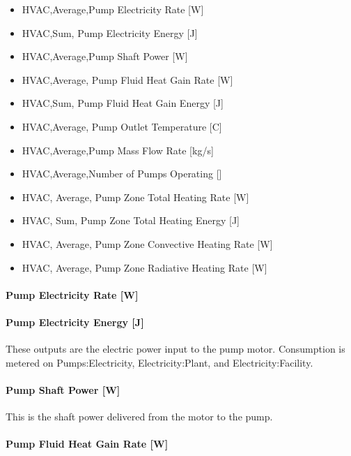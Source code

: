 \begin{itemize}
\item
  HVAC,Average,Pump Electricity Rate {[}W{]}
\item
  HVAC,Sum, Pump Electricity Energy {[}J{]}
\item
  HVAC,Average,Pump Shaft Power {[}W{]}
\item
  HVAC,Average, Pump Fluid Heat Gain Rate {[}W{]}
\item
  HVAC,Sum, Pump Fluid Heat Gain Energy {[}J{]}
\item
  HVAC,Average, Pump Outlet Temperature {[}C{]}
\item
  HVAC,Average,Pump Mass Flow Rate {[}kg/s{]}
\item
  HVAC,Average,Number of Pumps Operating {[]}
\item
  HVAC, Average, Pump Zone Total Heating Rate {[}W{]}
\item
  HVAC, Sum, Pump Zone Total Heating Energy {[}J{]}
\item
  HVAC, Average, Pump Zone Convective Heating Rate {[}W{]}
\item
  HVAC, Average, Pump Zone Radiative Heating Rate {[}W{]}
\end{itemize}

\paragraph{Pump Electricity Rate {[}W{]}}\label{pump-electric-power-w-3}

\paragraph{Pump Electricity Energy {[}J{]}}\label{pump-electric-energy-j-3}

These outputs are the electric power input to the pump motor. Consumption is metered on Pumps:Electricity, Electricity:Plant, and Electricity:Facility.

\paragraph{Pump Shaft Power {[}W{]}}\label{pump-shaft-power-w-3}

This is the shaft power delivered from the motor to the pump.

\paragraph{Pump Fluid Heat Gain Rate {[}W{]}}\label{pump-fluid-heat-gain-rate-w-3}


